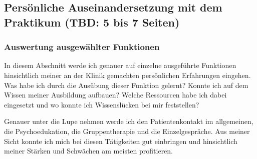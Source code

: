 \documentclass[jou,apacite]{apa6}
\begin{document}
\subsection{Persönliche Auseinandersetzung mit dem Praktikum (TBD: 5 bis 7 Seiten)} \label{sec:Auseinandersetzung}

\subsubsection{Auswertung ausgewählter Funktionen}
In diesem Abschnitt werde ich genauer auf einzelne ausgeführte Funktionen hinsichtlich meiner an der Klinik gemachten persönlichen Erfahrungen eingehen. Was habe ich durch die Ausübung dieser Funktion gelernt? Konnte ich auf dem Wissen meiner Ausbildung aufbauen? Welche Ressourcen habe ich dabei eingesetzt und wo konnte ich Wissenslücken bei mir feststellen? 

Genauer unter die Lupe nehmen werde ich den Patientenkontakt im allgemeinen, die Psychoedukation, die Gruppentherapie und die Einzelgespräche. Aus meiner Sicht konnte ich mich bei diesen Tätigkeiten gut einbringen und hinsichtlich meiner Stärken und Schwächen am meisten profitieren. 
\end{document}
